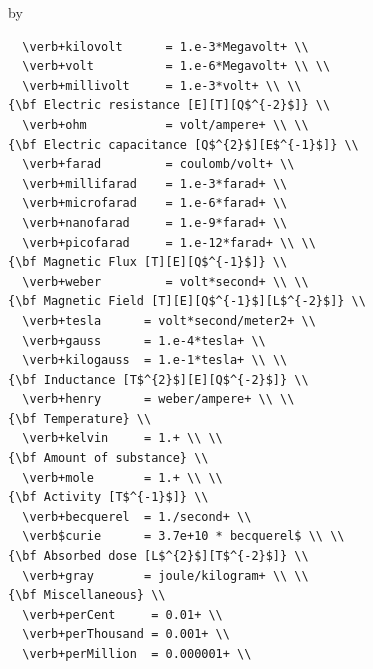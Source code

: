 \documentclass[twoside]{article}
\newcommand{\entrylabel}[1]{\mbox{\textbf{{#1}}}\hfil}%
\newenvironment{entry}
{\begin{list}{}%
    {\renewcommand{\makelabel}{\entrylabel}%
     \setlength{\labelwidth}{90pt}%
     \setlength{\leftmargin}{\labelwidth}
     \advance\leftmargin by \labelsep%
      }%
    }%
  {\end{list}}
\newcommand{\Entrylabel}[1]%
{\raisebox{0pt}[1ex][0pt]{\makebox[\labelwidth][l]%
    {\parbox[t]{\labelwidth}{\hspace{0pt}\textbf{{#1}}}}}}
\newenvironment{Entry}%
{\renewcommand{\entrylabel}{\Entrylabel}\begin{entry}}%
  {\end{entry}}
\begin{document}
\begin{description}
\begin{Entry}
\begin{verbatim}
  \verb+kilovolt      = 1.e-3*Megavolt+ \\
  \verb+volt          = 1.e-6*Megavolt+ \\ \\
  \verb+millivolt     = 1.e-3*volt+ \\ \\
{\bf Electric resistance [E][T][Q$^{-2}$]} \\
  \verb+ohm           = volt/ampere+ \\ \\
{\bf Electric capacitance [Q$^{2}$][E$^{-1}$]} \\
  \verb+farad         = coulomb/volt+ \\
  \verb+millifarad    = 1.e-3*farad+ \\
  \verb+microfarad    = 1.e-6*farad+ \\
  \verb+nanofarad     = 1.e-9*farad+ \\
  \verb+picofarad     = 1.e-12*farad+ \\ \\
{\bf Magnetic Flux [T][E][Q$^{-1}$]} \\
  \verb+weber         = volt*second+ \\ \\
{\bf Magnetic Field [T][E][Q$^{-1}$][L$^{-2}$]} \\
  \verb+tesla      = volt*second/meter2+ \\
  \verb+gauss      = 1.e-4*tesla+ \\
  \verb+kilogauss  = 1.e-1*tesla+ \\ \\
{\bf Inductance [T$^{2}$][E][Q$^{-2}$]} \\
  \verb+henry      = weber/ampere+ \\ \\
{\bf Temperature} \\
  \verb+kelvin     = 1.+ \\ \\
{\bf Amount of substance} \\
  \verb+mole       = 1.+ \\ \\
{\bf Activity [T$^{-1}$]} \\
  \verb+becquerel  = 1./second+ \\
  \verb$curie      = 3.7e+10 * becquerel$ \\ \\
{\bf Absorbed dose [L$^{2}$][T$^{-2}$]} \\
  \verb+gray       = joule/kilogram+ \\ \\
{\bf Miscellaneous} \\
  \verb+perCent     = 0.01+ \\
  \verb+perThousand = 0.001+ \\
  \verb+perMillion  = 0.000001+ \\


\end{verbatim}
\end{Entry}
\end{description}
\end{document}
